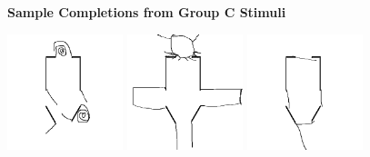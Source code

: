 \documentclass[../MA_Thesis.tex]{subfiles}
\begin{document}
\begin{appendix}
\begin{figure}[H]
\centering
\textbf{Sample Completions from Group C Stimuli}\par\medskip
\includegraphics[width=0.3\textwidth]{sample_completed_shapes/Group_3_Sample_1.png}
\includegraphics[width=0.3\textwidth]{sample_completed_shapes/Group_3_Sample_2.png}
\includegraphics[width=0.3\textwidth]{sample_completed_shapes/Group_3_Sample_3.png}
\end{figure}

\newpage

\end{appendix}
\end{document}
